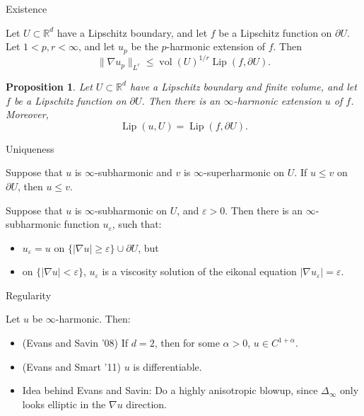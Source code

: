 \documentclass[10pt]{beamer}
\newcommand{\RR}{\mathbb{R}}
\DeclareMathOperator{\Lip}{Lip}
\newtheorem{proposition}{Proposition}
\begin{document}
\begin{frame}{Existence}
\begin{lemma}
Let $U \subset \RR^d$ have a Lipschitz boundary, and let $f$ be a Lipschitz function on $\partial U$.
Let $1 < p, r < \infty$, and let $u_p$ be the $p$-harmonic extension of $f$. Then
$$\|\nabla u_p\|_{L^r} \leq \operatorname{vol}(U)^{1/r} \Lip(f, \partial U) .$$
\end{lemma}
 
\begin{proposition}
Let $U \subset \RR^d$ have a Lipschitz boundary and finite volume, and let $f$ be a Lipschitz function on $\partial U$.
Then there is an $\infty$-harmonic extension $u$ of $f$. Moreover,
$$\Lip(u, U) = \Lip(f, \partial U).$$
\end{proposition}
\end{frame}

\begin{frame}{Uniqueness}
\begin{theorem}
Suppose that $u$ is $\infty$-subharmonic and $v$ is $\infty$-superharmonic on $U$.
If $u \leq v$ on $\partial U$, then $u \leq v$.
\end{theorem}

\begin{lemma}
Suppose that $u$ is $\infty$-subharmonic on $U$, and $\varepsilon > 0$.
Then there is an $\infty$-subharmonic function $u_\varepsilon$, such that: 
\begin{itemize}
\item $u_\varepsilon = u$ on $\{|\nabla u| \geq \varepsilon\} \cup \partial U$, but  
\item on $\{|\nabla u| < \varepsilon\}$, $u_\varepsilon$ is a viscosity solution of the eikonal equation $|\nabla u_\varepsilon| = \varepsilon$.
\end{itemize}
\end{lemma}
\end{frame}

\begin{frame}{Regularity}
\begin{theorem}
Let $u$ be $\infty$-harmonic. Then: 
\begin{itemize}
\item (Evans and Savin '08) If $d = 2$, then for some $\alpha > 0$, $u \in C^{1 + \alpha}$. 
\item (Evans and Smart '11) $u$ is differentiable. 
\end{itemize}
\end{theorem}

\begin{itemize}
    \item Idea behind Evans and Savin: Do a highly anisotropic blowup, since $\Delta_\infty$ only looks elliptic in the $\nabla u$ direction.
\end{itemize}
\end{frame}
\end{document}
